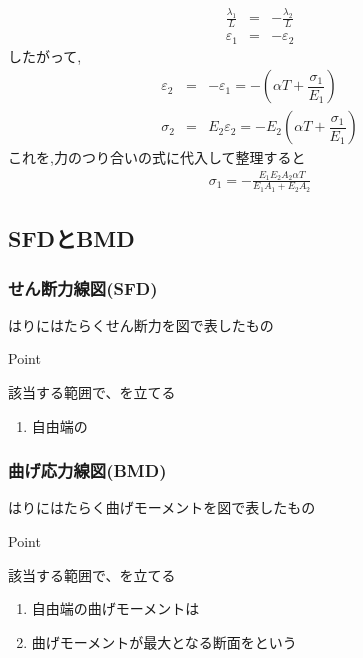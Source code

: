 \documentclass[a4paper]{jsarticle}
\begin{document}
\begin{enumerate}[(1)]
          \begin{eqnarray*}
              \frac{\lambda_1}{L}&=&-\frac{\lambda_2}{L}\\
              \varepsilon_1&=&-\varepsilon_2
          \end{eqnarray*}
          したがって,
          \begin{eqnarray*}
              \varepsilon_2&=&-\varepsilon_1=-\left(\alpha T+\dfrac{\sigma_1}{E_1}\right)\\
              \sigma_2&=&E_2\varepsilon_2=-E_2\left(\alpha T+\dfrac{\sigma_1}{E_1}\right)
          \end{eqnarray*}
          これを,力のつり合いの式に代入して整理すると
          \begin{eqnarray*}
              \sigma_1=-\frac{E_1E_2A_2\alpha T}{E_1A_1+E_2A_2}
          \end{eqnarray*}
\end{enumerate}
\subsection{SFDとBMD}
\subsubsection{せん断力線図(SFD)}
はりにはたらくせん断力を図で表したもの
\begin{itembox}[l]{Point}
    \begin{center}
        該当する範囲で、を立てる
    \end{center}
\end{itembox}
\begin{enumerate}[(1)]
    \item 自由端の
\end{enumerate}
\subsubsection{曲げ応力線図(BMD)}
はりにはたらく曲げモーメントを図で表したもの
\begin{itembox}[l]{Point}
    \begin{center}
        該当する範囲で、を立てる
    \end{center}
\end{itembox}
\begin{enumerate}[(1)]
    \item 自由端の曲げモーメントは
    \item 曲げモーメントが最大となる断面をという
\end{enumerate}
\end{document}
